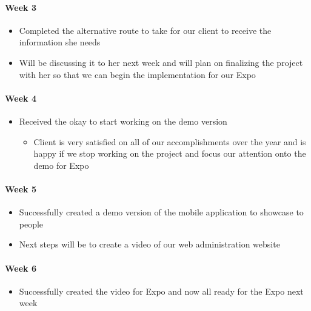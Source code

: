 \documentclass[onecolumn, draftclsnofoot,10pt, compsoc]{IEEEtran}
\begin{document}
      \paragraph{Week 3}
        \begin{itemize}
          \item Completed the alternative route to take for our client to receive the information she needs
          \item Will be discussing it to her next week and will plan on finalizing the project with her so that we can begin the implementation for our Expo
        \end{itemize}

      \paragraph{Week 4}
        \begin{itemize}
          \item Received the okay to start working on the demo version
            \begin{itemize}
              \item Client is very satisfied on all of our accomplishments over the year and is happy if we stop working on the project and focus our attention onto the demo for Expo
          \end{itemize}
        \end{itemize}

      \paragraph{Week 5}
        \begin{itemize}
          \item Successfully created a demo version of the mobile application to showcase to people
          \item Next steps will be to create a video of our web administration website
        \end{itemize}

      \paragraph{Week 6}
        \begin{itemize}
          \item Successfully created the video for Expo and now all ready for the Expo next week
        \end{itemize}
\end{document}
